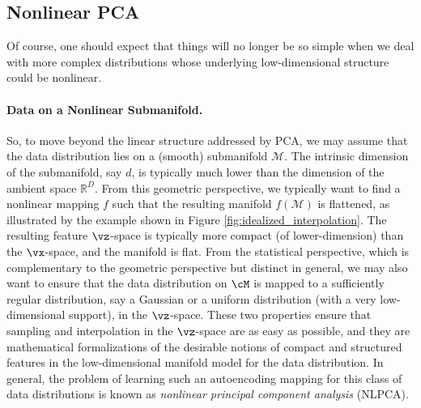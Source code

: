 \documentclass[../../book-main.tex]{subfiles}
\begin{document}
\subsection{Nonlinear PCA}\label{sub:nonlinear-pca}
Of course, one should expect that things will no longer be so simple
when we deal with more complex distributions whose underlying
low-dimensional structure could be nonlinear.

\paragraph{Data on a Nonlinear Submanifold.} So, to move beyond the
linear structure addressed by PCA, we may assume that the data distribution lies on a (smooth) submanifold $\mathcal{M}$. The intrinsic dimension of the submanifold, say $d$, is typically much lower than the
dimension of the ambient space $\mathbb{R}^D$. From this geometric
perspective, we typically want to find a nonlinear mapping $f$ such that
the resulting manifold
$f(\mathcal{M})$ is flattened, as illustrated by the example shown in Figure
\ref{fig:idealized_interpolation}. The resulting feature $\vz$-space
is typically
more compact (of lower-dimension) than the $\vx$-space, and the
manifold is flat.
From the statistical perspective, which is complementary to the geometric
perspective but distinct in general, we may also want to ensure that the data
distribution on $\cM$ is mapped to a sufficiently regular
distribution, say a Gaussian or a uniform distribution (with a 
very low-dimensional support), in the $\vz$-space. These two properties ensure that sampling and interpolation in the $\vz$-space are as easy as possible, and they are mathematical formalizations of the desirable
notions of compact and structured features in the low-dimensional manifold
model for the data distribution.
In general, the problem of learning such an autoencoding mapping for this class
of data distributions is known as {\em nonlinear principal component analysis}
(NLPCA).
\end{document}
